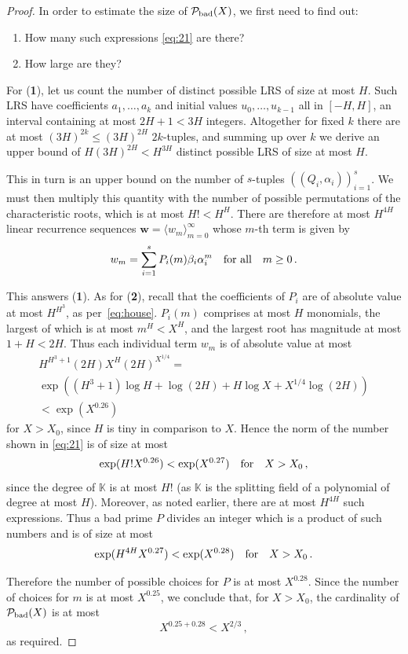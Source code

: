 \documentclass[preprint,12pt]{elsarticle}
\begin{document}
\begin{proof}
In order to estimate the size of ${\mathcal P}_{\text{\rm bad}}(X)$,
we first need to find out: 
\begin{enumerate}
\item[\textbf{1}.] How many such expressions \eqref{eq:21} are there?
\item[\textbf{2}.] How large are they?
\end{enumerate}

For (\textbf{1}), let us count the number of distinct possible LRS of
size at most $H$. Such LRS have coefficients $a_1,\ldots,a_k$ and initial values
$u_0,\ldots,u_{k-1}$ all in $[-H,H]$, an interval containing at
most $2H+1<3H$ integers. Altogether for fixed $k$ there are at most
$(3H)^{2k}\le (3H)^{2H}$ $2k$-tuples, and summing up over $k$ we
derive an upper bound of $H(3H)^{2H}<H^{3H}$ distinct
possible LRS of size at most $H$.

This in turn is an upper bound on
the number of $s$-tuples $((Q_i ,\alpha_i))_{i=1}^s$. We must then
multiply this quantity with the number of possible permutations of the
characteristic roots,
which is at most $H!<H^H$. There are therefore
at most $H^{4H}$ linear recurrence sequences
$\mathbf{w} = \langle w_m \rangle_{m=0}^{\infty}$ whose $m$-th term is
given by
\[
w_m=\sum_{i=1}^s P_i(m)\beta_i\alpha_i^m\quad {\text{\rm
    for~all}}\quad m\ge 0 \, .
\]

This answers (\textbf{1}).
As for (\textbf{2}), recall that the coefficients of $P_i$ are of
absolute value at most 
$H^{H^3}$, as per~\eqref{eq:house}. $P_i(m)$ comprises at most $H$ monomials, the largest of which
is at most $m^H < X^H$, and the largest root has
magnitude at most
$1+H < 2H$.
Thus each individual term $w_m$ is of absolute value at most
\begin{multline*}
  H^{H^3+1} (2H) X^H (2H)^{X^{1/4}} = \\
  \exp\left((H^3+1)\log H + \log (2H) + H \log X + X^{1/4}\log (2H)
  \right)\\ <\exp(X^{0.26})
\end{multline*}
for $X>X_0$, since $H$ is tiny in comparison to $X$.
Hence the norm of the number shown in \eqref{eq:21} is of size at most 
\[
\exp(H! X^{0.26})<\exp(X^{0.27})\quad {\text{\rm for}}\quad X>X_0 \,
,
\]
since the degree of $\mathbb{K}$ is at most $H!$ (as $\mathbb{K}$ is
the splitting field of a polynomial of degree at most $H$).
Moreover, as noted
earlier, there are at most $H^{4H}$ such expressions.
Thus a bad prime $P$ divides an integer which is a product of such numbers and is of size at most 
\[
\exp(H^{4H} X^{0.27})<\exp(X^{0.28})\quad {\text{\rm for}}\quad
X>X_0 \, .
\]

Therefore the number of possible choices for $P$ is at most $X^{0.28}$. Since
the number of choices for $m$ is at most $X^{0.25}$, we conclude that,
for $X > X_0$,
the cardinality of $\mathcal{P}_{\text{\rm bad}}(X)$ is at most
\[
X^{0.25+0.28} < X^{2/3} \, ,
\]
as required.
\end{proof}
\end{document}
